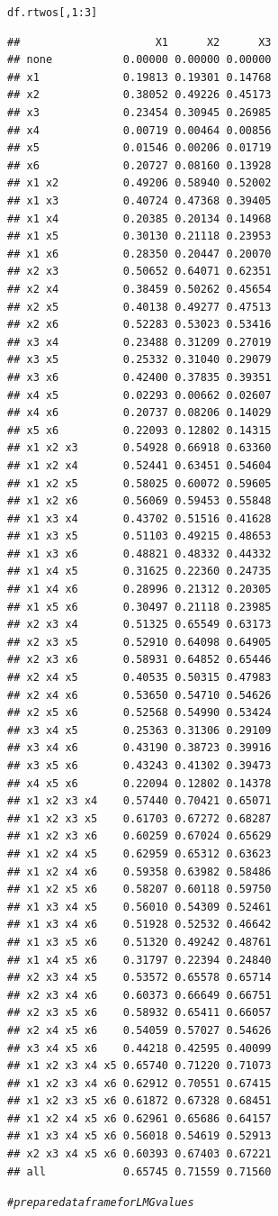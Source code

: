 \documentclass[11pt,a4paper,twoside]{book}
\makeatletter
\newcommand{\hlnum}[1]{\textcolor[rgb]{0.686,0.059,0.569}{#1}}%
\newcommand{\hlcom}[1]{\textcolor[rgb]{0.678,0.584,0.686}{\textit{#1}}}%
\newcommand{\hlopt}[1]{\textcolor[rgb]{0,0,0}{#1}}%
\newcommand{\hlstd}[1]{\textcolor[rgb]{0.345,0.345,0.345}{#1}}%
\newenvironment{kframe}{%
 \def\at@end@of@kframe{}%
 \ifinner\ifhmode%
  \def\at@end@of@kframe{\end{minipage}}%
  \begin{minipage}{\columnwidth}%
 \fi\fi%
 \def\FrameCommand##1{\hskip\@totalleftmargin \hskip-\fboxsep
 \colorbox{shadecolor}{##1}\hskip-\fboxsep
     \hskip-\linewidth \hskip-\@totalleftmargin \hskip\columnwidth}%
 \MakeFramed {\advance\hsize-\width
   \@totalleftmargin\z@ \linewidth\hsize
   \@setminipage}}%
 {\par\unskip\endMakeFramed%
 \at@end@of@kframe}
\newenvironment{knitrout}{}{} %
\makeatother
\begin{document}
\begin{knitrout}
\begin{kframe}
\begin{alltt}
\hlstd{df.rtwos[,}\hlnum{1}\hlopt{:}\hlnum{3}\hlstd{]}
\end{alltt}
\begin{verbatim}
##                     X1      X2      X3
## none           0.00000 0.00000 0.00000
## x1             0.19813 0.19301 0.14768
## x2             0.38052 0.49226 0.45173
## x3             0.23454 0.30945 0.26985
## x4             0.00719 0.00464 0.00856
## x5             0.01546 0.00206 0.01719
## x6             0.20727 0.08160 0.13928
## x1 x2          0.49206 0.58940 0.52002
## x1 x3          0.40724 0.47368 0.39405
## x1 x4          0.20385 0.20134 0.14968
## x1 x5          0.30130 0.21118 0.23953
## x1 x6          0.28350 0.20447 0.20070
## x2 x3          0.50652 0.64071 0.62351
## x2 x4          0.38459 0.50262 0.45654
## x2 x5          0.40138 0.49277 0.47513
## x2 x6          0.52283 0.53023 0.53416
## x3 x4          0.23488 0.31209 0.27019
## x3 x5          0.25332 0.31040 0.29079
## x3 x6          0.42400 0.37835 0.39351
## x4 x5          0.02293 0.00662 0.02607
## x4 x6          0.20737 0.08206 0.14029
## x5 x6          0.22093 0.12802 0.14315
## x1 x2 x3       0.54928 0.66918 0.63360
## x1 x2 x4       0.52441 0.63451 0.54604
## x1 x2 x5       0.58025 0.60072 0.59605
## x1 x2 x6       0.56069 0.59453 0.55848
## x1 x3 x4       0.43702 0.51516 0.41628
## x1 x3 x5       0.51103 0.49215 0.48653
## x1 x3 x6       0.48821 0.48332 0.44332
## x1 x4 x5       0.31625 0.22360 0.24735
## x1 x4 x6       0.28996 0.21312 0.20305
## x1 x5 x6       0.30497 0.21118 0.23985
## x2 x3 x4       0.51325 0.65549 0.63173
## x2 x3 x5       0.52910 0.64098 0.64905
## x2 x3 x6       0.58931 0.64852 0.65446
## x2 x4 x5       0.40535 0.50315 0.47983
## x2 x4 x6       0.53650 0.54710 0.54626
## x2 x5 x6       0.52568 0.54990 0.53424
## x3 x4 x5       0.25363 0.31306 0.29109
## x3 x4 x6       0.43190 0.38723 0.39916
## x3 x5 x6       0.43243 0.41302 0.39473
## x4 x5 x6       0.22094 0.12802 0.14378
## x1 x2 x3 x4    0.57440 0.70421 0.65071
## x1 x2 x3 x5    0.61703 0.67272 0.68287
## x1 x2 x3 x6    0.60259 0.67024 0.65629
## x1 x2 x4 x5    0.62959 0.65312 0.63623
## x1 x2 x4 x6    0.59358 0.63982 0.58486
## x1 x2 x5 x6    0.58207 0.60118 0.59750
## x1 x3 x4 x5    0.56010 0.54309 0.52461
## x1 x3 x4 x6    0.51928 0.52532 0.46642
## x1 x3 x5 x6    0.51320 0.49242 0.48761
## x1 x4 x5 x6    0.31797 0.22394 0.24840
## x2 x3 x4 x5    0.53572 0.65578 0.65714
## x2 x3 x4 x6    0.60373 0.66649 0.66751
## x2 x3 x5 x6    0.58932 0.65411 0.66057
## x2 x4 x5 x6    0.54059 0.57027 0.54626
## x3 x4 x5 x6    0.44218 0.42595 0.40099
## x1 x2 x3 x4 x5 0.65740 0.71220 0.71073
## x1 x2 x3 x4 x6 0.62912 0.70551 0.67415
## x1 x2 x3 x5 x6 0.61872 0.67328 0.68451
## x1 x2 x4 x5 x6 0.62961 0.65686 0.64157
## x1 x3 x4 x5 x6 0.56018 0.54619 0.52913
## x2 x3 x4 x5 x6 0.60393 0.67403 0.67221
## all            0.65745 0.71559 0.71560
\end{verbatim}
\begin{alltt}
\hlcom{# prepare data frame for LMG values}


\end{alltt}
\end{kframe}
\end{knitrout}
\end{document}
